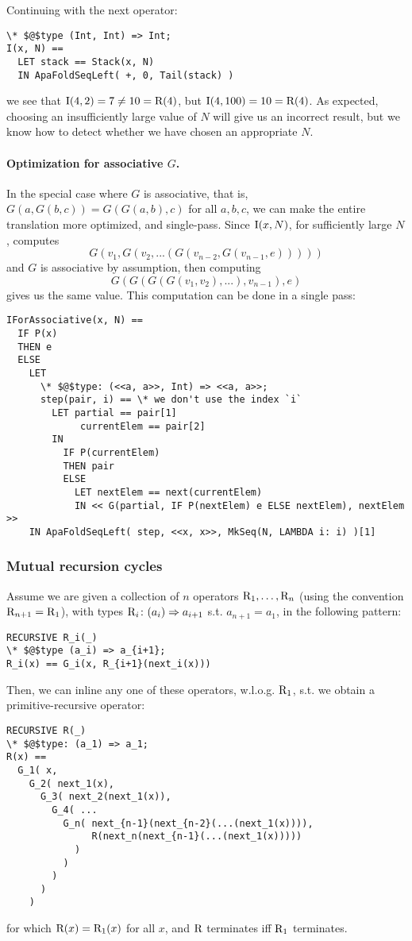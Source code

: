 \noindent Continuing with the next operator:
\begin{lstlisting}[language=tla,columns=fullflexible]
\* $@$type (Int, Int) => Int;
I(x, N) ==
  LET stack == Stack(x, N)
  IN ApaFoldSeqLeft( +, 0, Tail(stack) )
\end{lstlisting}
%
we see that $\mathrm{I}(4, 2) = 7 \ne 10 = \mathrm{R}(4)$, but $\mathrm{I}(4, 100) = 10 = \mathrm{R}(4)$.
As expected, choosing an insufficiently large value of $N$ will give us an incorrect result, but we know how to detect whether we have chosen an appropriate $N$.

\paragraph{Optimization for associative $G$.}
In the special case where $G$ is associative, that is, $G(a, G(b, c)) = G(G(a, b), c)$ for all $a,b,c$, we can make the entire translation more optimized, and single-pass. Since $\mathrm{I}(x,N)$, for sufficiently large $N$, computes 
\[
G(v_1, G(v_2, ... (G(v_{n-2}, G(v_{n-1}, e)))))
\]
%
and $G$ is associative by assumption, then computing
\[
G(G(G(G(v_1, v_2), ...), v_{n-1}), e)
\]
gives us the same value. This computation can be done in a single pass:
\begin{lstlisting}[language=tla,columns=fullflexible]
IForAssociative(x, N) ==
  IF P(x)
  THEN e
  ELSE
    LET 
      \* $@$type: (<<a, a>>, Int) => <<a, a>>;
      step(pair, i) == \* we don't use the index `i`
        LET partial == pair[1]
             currentElem == pair[2]
        IN
          IF P(currentElem)
          THEN pair
          ELSE
            LET nextElem == next(currentElem)
            IN << G(partial, IF P(nextElem) e ELSE nextElem), nextElem >>
    IN ApaFoldSeqLeft( step, <<x, x>>, MkSeq(N, LAMBDA i: i) )[1]
\end{lstlisting}

\subsubsection{ Mutual recursion cycles}

Assume we are given a collection of $n$ operators $\mathrm{R}_1, \dots, \mathrm{R}_n$ (using the convention $\mathrm{R}_{n+1} = \mathrm{R}_1$), with types $\mathrm{R}_i\colon (a_i) \Rightarrow a_{i+1}$ s.t. $a_{n+1} = a_1$, in the following pattern:

\begin{lstlisting}[language=tla,columns=fullflexible]
RECURSIVE R_i(_)
\* $@$type (a_i) => a_{i+1};
R_i(x) == G_i(x, R_{i+1}(next_i(x)))
\end{lstlisting}
%
Then, we can inline any one of these operators, w.l.o.g. $\mathrm{R}_1$, s.t. we obtain a primitive-recursive operator:
\begin{lstlisting}[language=tla,columns=fullflexible]
RECURSIVE R(_) 
\* $@$type: (a_1) => a_1;
R(x) ==
  G_1( x, 
    G_2( next_1(x),
      G_3( next_2(next_1(x)),
        G_4( ...
          G_n( next_{n-1}(next_{n-2}(...(next_1(x)))), 
               R(next_n(next_{n-1}(...(next_1(x)))))
            )
          )
        )
      )
    )
\end{lstlisting}
for which $\mathrm{R}(x) = \mathrm{R}_1(x)$ for all $x$, and $\mathrm{R}$ terminates iff $\mathrm{R}_1$ terminates.

